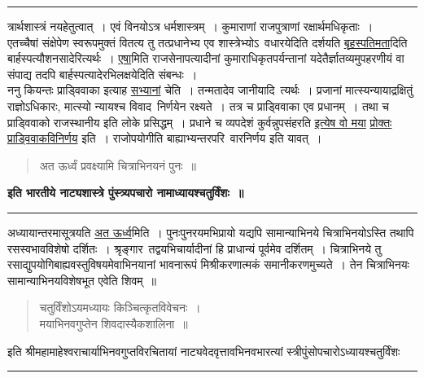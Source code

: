 \documentclass[11pt, openany]{book}
\begin{document}
\hrule

\vspace{2mm}
\noindent
त्रार्थशास्त्रं नयहेतुत्वात्~। एवं विनयोऽत्र धर्मशास्त्रम्~। कुमाराणां राजपुत्राणां रक्षार्थमधिकृताः~।\\

एतच्चैषां संक्षेपेण स्वरूपमुक्तं वितत्य तु तत्प्रधानेभ्य एव शास्त्रेभ्योऽ\textendash\ वधारयेदिति दर्शयति \underline{बृहस्पतिमता}दिति बार्हस्पत्यौशनसादेरित्यर्थः~। \underline{एषा}मिति राजसेनापत्यादीनां कुमाराधिकृतपर्यन्तानां यदेतैर्ज्ञातव्यमुपहरणीयं वा संपाद्य तदपि बार्हस्पत्यादेरभिलक्षयेदिति संबन्धः~।\\

ननु कियन्तः प्राड्विवाका इत्याह \underline{सभ्यानां} चेति~। तन्मतादेव जानीयादि\textendash\ त्यर्थः~। प्रजानां मात्स्यन्यायाद्रक्षितुं राज्ञोऽधिकारः, मात्स्यो न्यायश्च विवाद\textendash\ निर्णयेन रक्ष्यते~। तत्र च प्राड्विवाका एव प्रधानम्~। तथा च प्राड्विवाको राजस्थानीय इति लोके प्रसिद्धम्~। प्रधाने च व्यपदेशं कुर्वन्नुपसंहरति \underline{इत्येष वो मया} \underline{प्रोक्तः प्राड्विवाकविनिर्णय} इति~। राजोपयोगीति बाह्याभ्यन्तरपरि\textendash\ वारनिर्णय इति यावत्~।

\newpage

\begin{quote}
{\na अत ऊर्ध्वं प्रवक्ष्यामि चित्राभिनयनं पुनः~॥}
\end{quote}

\begin{center}
\textbf{इति भारतीये नाट्यशास्त्रे पुंस्त्र्यपचारो नामाध्यायश्चतुर्विंशः~॥}
\end{center}

\hrule

\vspace{2mm}
अध्यायान्तरमासूत्रयति \underline{अत ऊर्ध्व}मिति~। पुनःपुनरयमभिप्रायो यद्यपि सामान्याभिनये चित्राभिनयोऽस्ति तथापि रसस्वभावविशेषो दर्शितः~। श्रृङ्गार\textendash\ तद्वयभिचार्यादीनां हि प्राधान्यं पूर्वमेव दर्शितम्~। चित्राभिनये तु रसाद्युपयोगिबाह्यवस्तुविषयमेवाभिनयानां भावनारूपं मिश्रीकरणात्मकं समानीकरणमुच्यते~। तेन चित्राभिनयः सामान्याभिनयविशेषभूत एवेति शिवम्~॥

\begin{quote}
{\qt चतुर्विंशोऽयमध्यायः किञ्चित्कृतविवेचनः~।\\
मयाभिनवगुप्तेन शिवदास्यैकशालिना~॥}
\end{quote}

\begin{center}
इति श्रीमहामाहेश्वराचार्याभिनवगुप्तविरचितायां नाट्यवेदवृत्तावभिनवभारत्यां स्त्रीपुंसोपचारोऽध्यायश्चतुर्विंशः\\

\vspace{2cm}
\rule{0.2\linewidth}{0.5pt}
\end{center}
\end{document}
